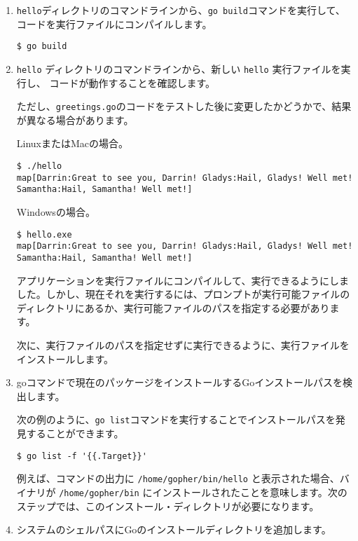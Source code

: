 \begin{enumerate}
\item \texttt{hello}ディレクトリのコマンドラインから、\texttt{go build}コマンドを実行して、コードを実行ファイルにコンパイルします。
\begin{lstlisting}[numbers=none]
$ go build
\end{lstlisting}

\item \texttt{hello} ディレクトリのコマンドラインから、新しい \texttt{hello} 実行ファイルを実行し、 コードが動作することを確認します。

ただし、\texttt{greetings.go}のコードをテストした後に変更したかどうかで、結果が異なる場合があります。

LinuxまたはMacの場合。
\begin{lstlisting}[numbers=none]
$ ./hello
map[Darrin:Great to see you, Darrin! Gladys:Hail, Gladys! Well met! Samantha:Hail, Samantha! Well met!]
\end{lstlisting}
Windowsの場合。
\begin{lstlisting}[numbers=none]
$ hello.exe
map[Darrin:Great to see you, Darrin! Gladys:Hail, Gladys! Well met! Samantha:Hail, Samantha! Well met!]
\end{lstlisting}

アプリケーションを実行ファイルにコンパイルして、実行できるようにしました。しかし、現在それを実行するには、プロンプトが実行可能ファイルのディレクトリにあるか、実行可能ファイルのパスを指定する必要があります。

次に、実行ファイルのパスを指定せずに実行できるように、実行ファイルをインストールします。

\item goコマンドで現在のパッケージをインストールするGoインストールパスを検出します。

次の例のように、\texttt{go list}コマンドを実行することでインストールパスを発見することができます。

\begin{lstlisting}[numbers=none]
$ go list -f '{{.Target}}'
\end{lstlisting}

例えば、コマンドの出力に \texttt{/home/gopher/bin/hello} と表示された場合、バイナリが \texttt{/home/gopher/bin} にインストールされたことを意味します。次のステップでは、このインストール・ディレクトリが必要になります。

\item システムのシェルパスにGoのインストールディレクトリを追加します。


\end{enumerate}
